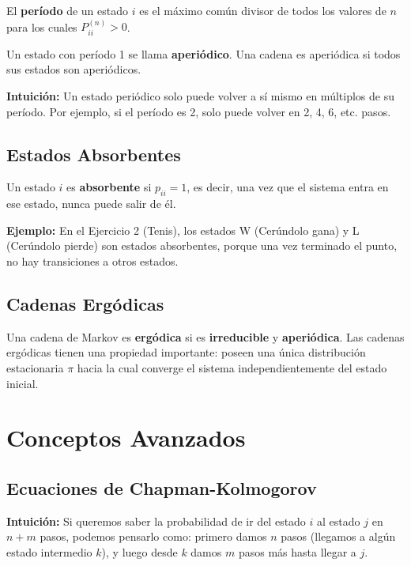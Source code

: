 \documentclass[a4paper,11pt]{article}
\begin{document}
El \textbf{período} de un estado $i$ es el máximo común divisor de todos los valores de $n$ para los cuales $P_{ii}^{(n)} > 0$.

\vspace{0.5em}

Un estado con período 1 se llama \textbf{aperiódico}. Una cadena es aperiódica si todos sus estados son aperiódicos.

\vspace{0.5em}

\textbf{Intuición:} Un estado periódico solo puede volver a sí mismo en múltiplos de su período. Por ejemplo, si el período es 2, solo puede volver en 2, 4, 6, etc. pasos.

\subsection{Estados Absorbentes}

Un estado $i$ es \textbf{absorbente} si $p_{ii} = 1$, es decir, una vez que el sistema entra en ese estado, nunca puede salir de él.

\vspace{0.5em}

\textbf{Ejemplo:} En el Ejercicio 2 (Tenis), los estados W (Cerúndolo gana) y L (Cerúndolo pierde) son estados absorbentes, porque una vez terminado el punto, no hay transiciones a otros estados.

\subsection{Cadenas Ergódicas}

Una cadena de Markov es \textbf{ergódica} si es \textbf{irreducible} y \textbf{aperiódica}. Las cadenas ergódicas tienen una propiedad importante: poseen una única distribución estacionaria $\pi$ hacia la cual converge el sistema independientemente del estado inicial.

\section{Conceptos Avanzados}

\subsection{Ecuaciones de Chapman-Kolmogorov}

\textbf{Intuición:} Si queremos saber la probabilidad de ir del estado $i$ al estado $j$ en $n+m$ pasos, podemos pensarlo como: primero damos $n$ pasos (llegamos a algún estado intermedio $k$), y luego desde $k$ damos $m$ pasos más hasta llegar a $j$.
\end{document}
